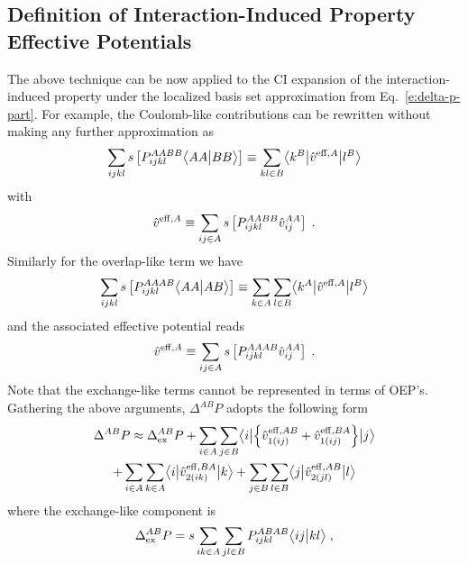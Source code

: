 \subsection{\label{ss:2.4}Definition of Interaction-Induced Property Effective Potentials}

The above technique can be now applied to the CI expansion of the interaction\hyp{}induced property
under the localized basis set approximation 
from Eq.~\eqref{e:delta-p-part}.
For example, the Coulomb\hyp{}like contributions
can be rewritten without making any further approximation as
%
\begin{equation}
 \sum_{ijkl} 
	{s} \left[ P^{AABB}_{ijkl} \bigl\langle {AA} \bigl\lvert {BB} \bigr\rangle \right]
 \equiv
	\sum_{kl\in B} 
	\bigl\langle {k^B} \bigl\lvert {\hat{v}^{{\rm eff},A}} \bigl\lvert {l^B} \bigr\rangle
\end{equation}
%
with
%
\begin{equation}
 \hat{v}^{{\rm eff},A} 
	\equiv \sum_{ij\in A} {s} \left[ P^{AABB}_{ijkl} \hat{v}^{AA}_{ij} \right]  \;.
\end{equation}
%
Similarly for the overlap\hyp{}like term we have
%
\begin{equation}
 \sum_{ijkl} 
	{s} \left[ P^{AAAB}_{ijkl} \bigl\langle {AA} \bigl\lvert {AB} \bigr\rangle \right]
 \equiv
	\sum_{k\in A} \sum_{l\in B} 
	\bigl\langle {k^A} \bigl\lvert {\hat{v}^{{\rm eff},A}} \bigl\lvert {l^B} \bigr\rangle
\end{equation}
%
and the associated effective potential reads
%
\begin{equation}
 \hat{v}^{{\rm eff},A} 
	\equiv \sum_{ij\in A} {s} \left[ P^{AAAB}_{ijkl} \hat{v}^{AA}_{ij} \right] \;.
\end{equation}
%
Note that the exchange\hyp{}like terms cannot be represented in terms of OEP's.
Gathering the above arguments, $\Delta^{AB}P$ adopts the following form
%
\begin{multline} \label{e:ci-oep-master}
 \Delta^{AB}P \approx \Delta_{\rm ex}^{AB} P
	+ \sum_{i\in A} \sum_{j\in B} 
	  \bigl\langle {i} \bigl\lvert { \left\{ \hat{v}^{{\rm eff},AB}_{1(ij)} + \hat{v}^{{\rm eff},BA}_{1(ij)}  \right\} } \bigl\lvert {j} \bigr\rangle
	 \\ +
	\sum_{i\in A} \sum_{k\in A}
	  \bigl\langle {i} \bigl\lvert {\hat{v}^{{\rm eff},BA}_{2(ik)} } \bigl\lvert {k} \bigr\rangle
	 +
        \sum_{j\in B} \sum_{l\in B}
          \bigl\langle {j} \bigl\lvert {\hat{v}^{{\rm eff},AB}_{2(jl)} } \bigl\lvert {l} \bigr\rangle
\end{multline}
%
where the exchange\hyp{}like component is
%
\begin{equation}
	\Delta_{\rm ex}^{AB} P = 
	s \sum_{ik\in A} \sum_{jl\in B}
	P^{ABAB}_{ijkl} \bigl\langle {ij} \bigl\lvert {kl} \bigr\rangle \;,
\end{equation}
